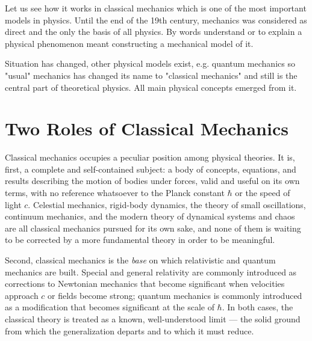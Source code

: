 Let us see how it works in classical mechanics which is
one of the most important models in physics.
Until the end of the 19th century, mechanics was considered as direct and the only
the basis of all physics. By words understand or
to explain a physical phenomenon meant constructing a mechanical model of it.

Situation has changed,  other physical models exist, e.g. quantum mechanics so 
"usual" mechanics has changed its name to "classical mechanics" and still is
the central part of theoretical physics. All main physical concepts emerged from
it.

\section{Two Roles of Classical Mechanics}
\label{sec:cis-2r}
Classical mechanics occupies a peculiar position among physical theories. It is,
first, a complete and self-contained subject: a body of concepts, equations, and
results describing the motion of bodies under forces, valid and useful on its own
terms, with no reference whatsoever to the Planck constant $\hbar$ or the speed of
light $c$. Celestial mechanics, rigid-body dynamics, the theory of small
oscillations, continuum mechanics, and the modern theory of dynamical systems and
chaos are all classical mechanics pursued for its own sake, and none of them is
waiting to be corrected by a more fundamental theory in order to be meaningful.

Second,  classical mechanics is
the \emph{base} on which relativistic and quantum mechanics are built. Special and
general relativity are commonly introduced as corrections to Newtonian mechanics
that become significant when velocities approach $c$ or fields become strong;
quantum mechanics is commonly introduced as a modification that becomes significant
at the scale of $\hbar$. In both cases, the classical theory is treated as a known,
well-understood limit --- the solid ground from which the generalization departs
and to which it must reduce.

